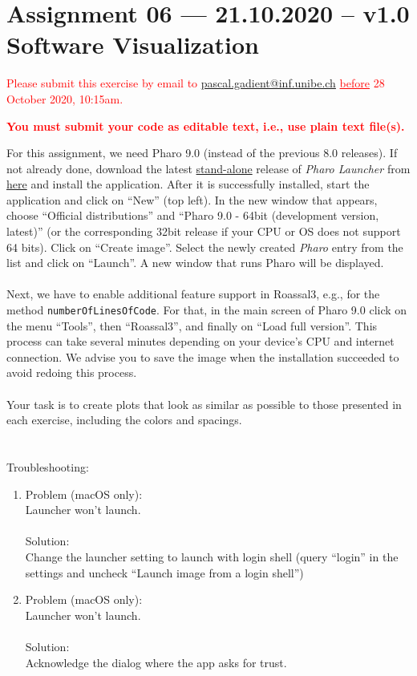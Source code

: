 \documentclass [11pt, a4wide, twoside]{article}
\begin{document}
\section*{Assignment 06 --- 21.10.2020 -- v1.0\\Software Visualization}

\textcolor{red}{Please submit this exercise by email to \href{mailto:pascal.gadient@inf.unibe.ch}{pascal.gadient@inf.unibe.ch} \underline{before} 28 October 2020, 10:15am.\begin{center}\textbf{You must submit your code as editable text, i.e., use plain text file(s).}\end{center}}

\noindent For this assignment, we need Pharo 9.0 (instead of the previous 8.0 releases). If not already done, download the latest \underline{stand-alone} release of \emph{Pharo Launcher} from \href{https://pharo.org/download}{here} and install the application. After it is successfully installed, start the application and click on ``New'' (top left). In the new window that appears, choose ``Official distributions'' and ``Pharo 9.0 - 64bit (development version, latest)'' (or the corresponding 32bit release if your CPU or OS does not support 64 bits). Click on ``Create image''. Select the newly created \emph{Pharo} entry from the list and click on ``Launch''. A new window that runs Pharo will be displayed.\\\\
Next, we have to enable additional feature support in Roassal3, e.g., for the method \texttt{number\-Of\-Lines\-Of\-Code}. For that, in the main screen of Pharo 9.0 click on the menu ``Tools'', then ``Roassal3'', and finally on ``Load full version''. This process can take several minutes depending on your device's CPU and internet connection. We advise you to save the image when the installation succeeded to avoid redoing this process.\\\\
Your task is to create plots that look as similar as possible to those presented in each exercise, including the colors and spacings.\\\\\\
Troubleshooting:
\begin{enumerate}
\item Problem (macOS only):\\Launcher won't launch.\\\\
Solution:\\Change the launcher setting to launch with login shell (query ``login'' in the settings and uncheck ``Launch image from a login shell'')
\item Problem (macOS only):\\
Launcher won't launch.\\\\
Solution:\\Acknowledge the dialog where the app asks for trust.
\end{enumerate}
\end{document}
